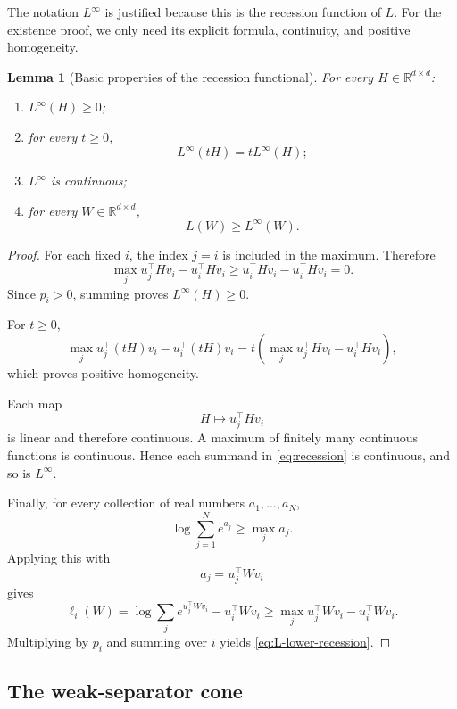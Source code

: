 \documentclass[11pt]{article}
\newtheorem{lemma}[theorem]{Lemma}
\newcommand{\R}{\mathbb{R}}
\newcommand{\1}{\mathbf{1}}
\begin{document}
The notation \(L^\infty\) is justified because this is the recession
function of \(L\). For the existence proof, we only need its explicit
formula, continuity, and positive homogeneity.

\begin{lemma}[Basic properties of the recession functional]
\label{lem:recession-basic}
For every \(H\in\R^{d\times d}\):

\begin{enumerate}[label=(\roman*)]
\item \(L^\infty(H)\ge 0\);

\item for every \(t\ge 0\),
\[
L^\infty(tH)=tL^\infty(H);
\]

\item \(L^\infty\) is continuous;

\item for every \(W\in\R^{d\times d}\),
\begin{equation}
L(W)\ge L^\infty(W).
\label{eq:L-lower-recession}
\end{equation}
\end{enumerate}
\end{lemma}

\begin{proof}
For each fixed \(i\), the index \(j=i\) is included in the maximum.
Therefore
\[
\max_j u_j^\top Hv_i-u_i^\top Hv_i
\ge
u_i^\top Hv_i-u_i^\top Hv_i
=
0.
\]
Since \(p_i>0\), summing proves \(L^\infty(H)\ge 0\).

For \(t\ge 0\),
\[
\max_j u_j^\top(tH)v_i-u_i^\top(tH)v_i
=
t
\left(
\max_j u_j^\top Hv_i-u_i^\top Hv_i
\right),
\]
which proves positive homogeneity.

Each map
\[
H\longmapsto u_j^\top Hv_i
\]
is linear and therefore continuous. A maximum of finitely many continuous
functions is continuous. Hence each summand in
\eqref{eq:recession} is continuous, and so is \(L^\infty\).

Finally, for every collection of real numbers \(a_1,\dots,a_N\),
\[
\log\sum_{j=1}^{N}e^{a_j}
\ge
\max_j a_j.
\]
Applying this with
\[
a_j=u_j^\top Wv_i
\]
gives
\[
\ell_i(W)
=
\log\sum_j e^{u_j^\top Wv_i}
-
u_i^\top Wv_i
\ge
\max_j u_j^\top Wv_i-u_i^\top Wv_i.
\]
Multiplying by \(p_i\) and summing over \(i\) yields
\eqref{eq:L-lower-recession}.
\end{proof}

\subsection{The weak-separator cone}
\end{document}
